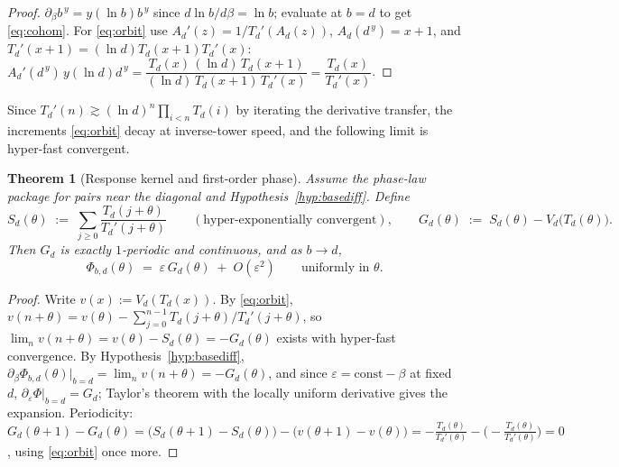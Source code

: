 \documentclass[11pt,a4paper]{article}
\newtheorem{theorem}{Theorem}[section]
\theoremstyle{definition}
\theoremstyle{remark}
\begin{document}
\begin{proof}
$\partial_\beta b^{\,y}=y(\ln b)b^{\,y}$ since $d\ln b/d\beta=\ln b$; evaluate at $b=d$ to
get \eqref{eq:cohom}. For \eqref{eq:orbit} use $A_d'(z)=1/T_d'(A_d(z))$, $A_d(d^{\,y})=x+1$,
and $T_d'(x+1)=(\ln d)T_d(x+1)T_d'(x)$:
$A_d'(d^{\,y})\,y(\ln d)d^{\,y}
=\dfrac{T_d(x)\,(\ln d)\,T_d(x+1)}{(\ln d)\,T_d(x+1)\,T_d'(x)}=\dfrac{T_d(x)}{T_d'(x)}$.
\end{proof}

Since $T_d'(n)\gtrsim(\ln d)^n\prod_{i<n}T_d(i)$ by iterating the derivative transfer, the
increments \eqref{eq:orbit} decay at inverse-tower speed, and the following limit is
hyper-fast convergent.

\begin{theorem}[Response kernel and first-order phase]\label{thm:kernel}
Assume the phase-law package for pairs near the diagonal and
Hypothesis~\ref{hyp:basediff}. Define
\[
S_d(\theta)\;:=\;\sum_{j\ge0}\frac{T_d(j+\theta)}{T_d'(j+\theta)}
\qquad(\text{hyper-exponentially convergent}),
\qquad
G_d(\theta)\;:=\;S_d(\theta)-V_d\bigl(T_d(\theta)\bigr).
\]
Then $G_d$ is exactly $1$-periodic and continuous, and as $b\to d$,
\[
\Phi_{b,d}(\theta)\;=\;\varepsilon\,G_d(\theta)\;+\;O(\varepsilon^2)
\qquad\text{uniformly in }\theta .
\]
\end{theorem}

\begin{proof}
Write $v(x):=V_d(T_d(x))$. By \eqref{eq:orbit},
$v(n+\theta)=v(\theta)-\sum_{j=0}^{n-1}T_d(j+\theta)/T_d'(j+\theta)$, so
$\lim_n v(n+\theta)=v(\theta)-S_d(\theta)=-G_d(\theta)$ exists with hyper-fast convergence.
By Hypothesis~\ref{hyp:basediff},
$\partial_\beta\Phi_{b,d}(\theta)\big|_{b=d}=\lim_n v(n+\theta)=-G_d(\theta)$, and since
$\varepsilon=\mathrm{const}-\beta$ at fixed $d$, $\partial_\varepsilon\Phi\big|_{b=d}=G_d$;
Taylor's theorem with the locally uniform derivative gives the expansion. Periodicity:
$G_d(\theta+1)-G_d(\theta)=\bigl(S_d(\theta+1)-S_d(\theta)\bigr)
-\bigl(v(\theta+1)-v(\theta)\bigr)
=-\tfrac{T_d(\theta)}{T_d'(\theta)}-\bigl(-\tfrac{T_d(\theta)}{T_d'(\theta)}\bigr)=0$,
using \eqref{eq:orbit} once more.
\end{proof}
\end{document}
